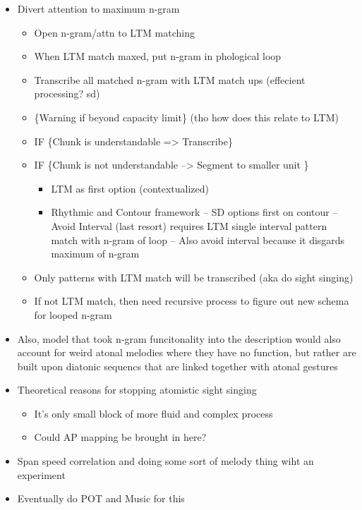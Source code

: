\documentclass[]{book}
\providecommand{\tightlist}{%
  \setlength{\itemsep}{0pt}\setlength{\parskip}{0pt}}
\theoremstyle{definition}
\theoremstyle{definition}
\theoremstyle{definition}
\theoremstyle{remark}
\begin{document}
\begin{itemize}
\item
  Divert attention to maximum n-gram

  \begin{itemize}
  \item
    Open n-gram/attn to LTM matching
  \item
    When LTM match maxed, put n-gram in phological loop
  \item
    Transcribe all matched n-gram with LTM match ups (effecient
    processing? sd)
  \item
    \{Warning if beyond capacity limit\} (tho how does this relate to
    LTM)
  \item
    IF \{Chunk is understandable =\textgreater{} Transcribe\}
  \item
    IF \{Chunk is not understandable --\textgreater{} Segment to smaller
    unit \}

    \begin{itemize}
    \tightlist
    \item
      LTM as first option (contextualized)
    \item
      Rhythmic and Contour framework -- SD options first on contour --
      Avoid Interval (last resort) requires LTM single interval pattern
      match with n-gram of loop -- Also avoid interval because it
      disgards maximum of n-gram
    \end{itemize}
  \item
    Only patterns with LTM match will be transcribed (aka do sight
    singing)
  \item
    If not LTM match, then need recursive process to figure out new
    schema for looped n-gram
  \end{itemize}
\item
  Also, model that took n-gram funcitonality into the description would
  also account for weird atonal melodies where they have no function,
  but rather are built upon diatonic sequencs that are linked together
  with atonal gestures
\item
  Theoretical reasons for stopping atomistic sight singing

  \begin{itemize}
  \tightlist
  \item
    It's only small block of more fluid and complex process
  \item
    Could AP mapping be brought in here?
  \end{itemize}
\item
  Span speed correlation and doing some sort of melody thing wiht an
  experiment
\item
  Eventually do POT and Music for this
\end{itemize}
\end{document}
